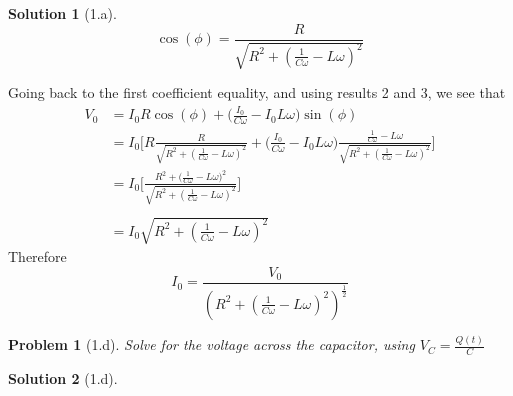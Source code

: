 \documentclass[12pt]{article}
\newtheorem*{problem}{Problem}
\theoremstyle{definition}
\newtheorem*{solution}{Solution}
\begin{document}
\begin{solution}[1.a]
\begin{equation}
\cos(\phi) = \frac{R}{\sqrt{R^2 + (\frac{1}{C\omega}-L\omega)^2}}
\end{equation}

Going back to the first coefficient equality, and using results 2 and 3, we see that
\[
\begin{aligned}
V_0 & = I_0R\cos(\phi) + \big(\frac{I_0}{C\omega}-I_0L\omega\big)\sin(\phi)\\
    & = I_0 \Big[ R\frac{R}{\sqrt{R^2 + (\frac{1}{C\omega}-L\omega)^2}} + \big(\frac{I_0}{C\omega}-I_0L\omega\big)\frac{\frac{1}{C\omega}-L\omega}{\sqrt{R^2 + (\frac{1}{C\omega}-L\omega)^2}}\Big]\\
    & = I_0 \Big[\frac{R^2 + \big(\frac{1}{C\omega}-L\omega\big)^2}{\sqrt{R^2 + (\frac{1}{C\omega}-L\omega)^2}}\Big]\\
\\
    & = I_0 \sqrt{R^2 + (\frac{1}{C\omega}-L\omega)^2}
\end{aligned}
\]
Therefore
\begin{equation}
\boxed{I_0 = \frac{V_0}{(R^2 + (\frac{1}{C\omega}-L\omega)^2)^{\frac{1}{2}}}}
\end{equation}

\end{solution}

\begin{problem}[1.d]
Solve for the voltage across the capacitor, using $V_C = \frac{Q(t)}{C}$
\end{problem}

\begin{solution}[1.d]



\end{solution}
\end{document}
